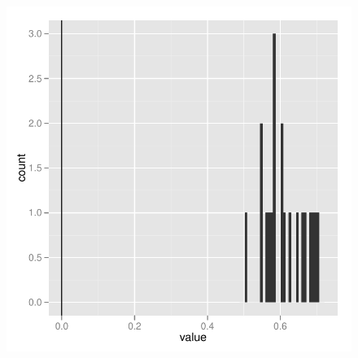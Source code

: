 \documentclass{elsarticle}
\makeatletter
\newenvironment{kframe}{%
 \def\FrameCommand##1{\hskip\@totalleftmargin \hskip-\fboxsep
 \colorbox{shadecolor}{##1}\hskip-\fboxsep
     \hskip-\linewidth \hskip-\@totalleftmargin \hskip\columnwidth}%
 \MakeFramed {\advance\hsize-\width
   \@totalleftmargin\z@ \linewidth\hsize
   \@setminipage}}%
 {\par\unskip\endMakeFramed}
\newenvironment{knitrout}{}{} %
\makeatother
\begin{document}
\begin{figure}
\begin{center}
\begin{knitrout}
\begin{kframe}
{\centering \includegraphics{simtree_plot} 

}

\end{kframe}
\end{knitrout}

\end{center}
\label{fig:onec}
\end{figure}
\end{document}
